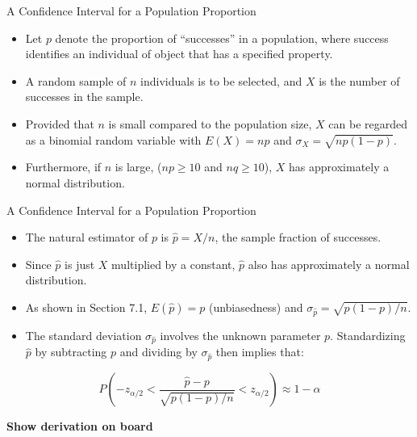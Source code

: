 \documentclass[
  ignorenonframetext,
]{beamer}
\providecommand{\tightlist}{%
  \setlength{\itemsep}{0pt}\setlength{\parskip}{0pt}}\usepackage{longtable,booktabs,array}
\begin{document}
\begin{frame}{A Confidence Interval for a Population Proportion}
\protect\hypertarget{a-confidence-interval-for-a-population-proportion}{}
\begin{itemize}[<+->]
\tightlist
\item
  Let \(p\) denote the proportion of ``successes'' in a population,
  where success identifies an individual of object that has a specified
  property.
\item
  A random sample of \(n\) individuals is to be selected, and \(X\) is
  the number of successes in the sample.
\item
  Provided that \(n\) is small compared to the population size, \(X\)
  can be regarded as a binomial random variable with \(E(X) = np\) and
  \(\sigma_{X} = \sqrt{np(1-p)}\).
\item
  Furthermore, if \(n\) is large, (\(np \geq 10\) and \(nq \geq 10\)),
  \(X\) has approximately a normal distribution.
\end{itemize}
\end{frame}

\begin{frame}{A Confidence Interval for a Population Proportion}
\protect\hypertarget{a-confidence-interval-for-a-population-proportion-1}{}
\begin{itemize}[<+->]
\tightlist
\item
  The natural estimator of \(p\) is \(\hat{p} = X/n\), the sample
  fraction of successes.
\item
  Since \(\hat{p}\) is just \(X\) multiplied by a constant, \(\hat{p}\)
  also has approximately a normal distribution.
\item
  As shown in Section 7.1, \(E(\hat{p}) = p\) (unbiasedness) and
  \(\sigma_{\hat{p}} = \sqrt{p(1-p)/n}\).
\item
  The standard deviation \(\sigma_{\hat{p}}\) involves the unknown
  parameter \(p\). Standardizing \(\hat{p}\) by subtracting \(p\) and
  dividing by \(\sigma_{\hat{p}}\) then implies that:
\end{itemize}

\[
P(-z_{\alpha/2} < \frac{\hat{p} - p}{\sqrt{p(1-p)/n}} < z_{\alpha/2}) \approx 1-\alpha
\]

\textbf{Show derivation on board}
\end{frame}
\end{document}
